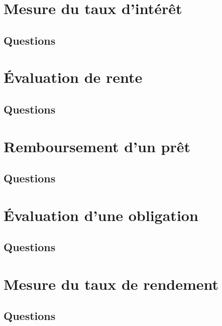 \documentclass[12pt, french]{report}
\begin{document}
\tableofcontents
\chapter{Mesure du taux d'intérêt}
\section{Questions}




\chapter{Évaluation de rente}
\section{Questions}




\chapter{Remboursement d'un prêt}
\section{Questions}




\chapter{Évaluation d'une obligation}
\section{Questions}




\chapter{Mesure du taux de rendement}
\section{Questions}

\end{document}
